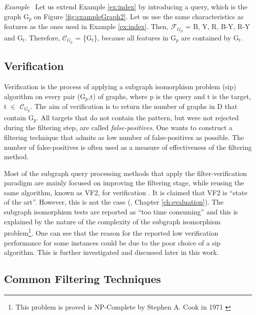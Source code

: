 \documentclass{l4proj}
\newcounter{example}[section]
\newenvironment{example}[1][]{\refstepcounter{example}\par\medskip
   \noindent \textit{Example~\theexample #1} \rmfamily}{\medskip}
\newcommand{\fancyC}{\mathcal{C}}
\newcommand{\fancyF}{\mathcal{F}}
\begin{document}
\begin{example}
Let us extend Example \ref{ex:index} by introducing a query, which is the graph G$_{p}$ on Figure \ref{fig:exampleGraph2}. Let us use the same characteristics as features as the ones used in Example \ref{ex:index}. Then, $\fancyF_{G_{p}}$ = B, Y, R, B-Y, R-Y and G$_{t}$. Therefore, $\fancyC_{G_{p}}$ = \{G$_{t}$\}, because all features in G$_{p}$ are contained by G$_{t}$.
\end{example}

\subsection{Verification}
Verification is the process of applying a subgraph isomorphism problem (\gls{sip}) algorithm on every pair (G$_{p}$,t) of graphs, where p is the query and t is the target, t $\in$ $\fancyC_{G_{p}}$. The aim of verification is to return the number of graphs in D that contain G$_{p}$. All targets that do not contain the pattern, but were not rejected during the filtering step, are called \emph{false-positives}. One wants to construct a filtering technique that admits as low number of false-positives as possible. The number of false-positives is often used as a measure of effectiveness of the filtering method\cite{foteini}.

Most of the subgraph query processing methods that apply the filter-verification paradigm are mainly focused on improving the filtering stage, while reusing the same algorithm, known as VF2, for verification \cite{foteini}. 
It is claimed that VF2 is ``state of the art''\cite{ctindex}. However, this is not the case (\cite{Solnon:2010, Larrosa:2002, Bonnici:2013, Zampelli:2010, CP2015}, Chapter \ref{ch:evaluation}). The subgraph isomorphism tests are reported as ``too time consuming''\cite{foteini} and this is explained by the nature of the complexity of the subgraph isomorphism problem\footnote{This problem is proved is NP-Complete by Stephen A. Cook in 1971 \cite{Cook:1971}}\cite{ctindex,foteini,freqStructBasedIndexing}. One can see that the reason for the reported low verification performance for some instances could be due to the poor choice of a \gls{sip} algorithm. This is further investigated and discussed later in this work.

\subsection{Common Filtering Techniques}
\label{subse:existingFVtechniques}
\end{document}
